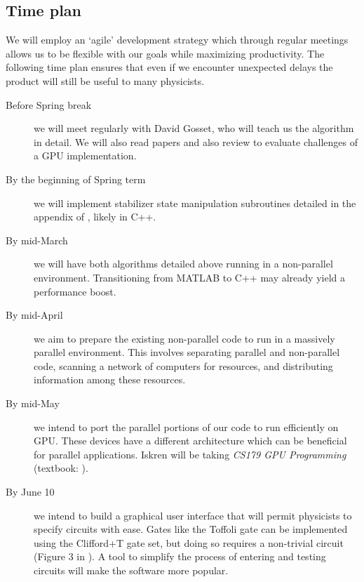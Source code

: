 \documentclass[11pt]{article}
\begin{document}
\begin{multicols}{2}

\subsection*{Time plan}
We will employ an `agile' development strategy which through regular meetings allows us to be flexible with our goals while maximizing productivity. The following time plan ensures that even if we encounter unexpected delays the product will still be useful to many physicists.

\begin{description}
    \item[Before Spring break] we will meet regularly with David Gosset, who will teach us the algorithm in detail. We will also read papers and also review \cite{cudahandbook} to evaluate challenges of a GPU implementation.\\
    \item[By the beginning of Spring term] we will implement stabilizer state manipulation subroutines detailed in the appendix of \cite{bravyi-gosset}, likely in C++.\\
    \item[By mid-March] we will have both algorithms detailed above running in a non-parallel environment. Transitioning from MATLAB to C++ may already yield a performance boost.
    \item[By mid-April] we aim to prepare the existing non-parallel code to run in a massively parallel environment. This involves separating parallel and non-parallel code, scanning a network of computers for resources, and distributing information among these resources.\\
    \item[By mid-May] we intend to port the parallel portions of our code to run efficiently on GPU. These devices have a different architecture which can be beneficial for parallel applications. Iskren will be taking \textit{CS179 GPU Programming} (textbook: \cite{cudahandbook}). \\
    \item[By June 10] we intend to build a graphical user interface that will permit physicists to specify circuits with ease. Gates like the Toffoli gate can be implemented using the Clifford+T gate set, but doing so requires a non-trivial circuit (Figure 3 in \cite{bravyi-gosset}). A tool to simplify the process of entering and testing circuits will make the software more popular. \end{description}

\end{multicols}
\end{document}
